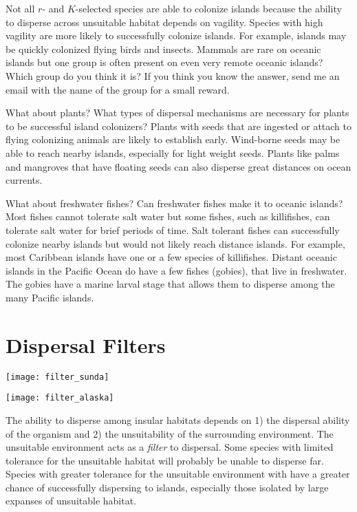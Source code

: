 \documentclass{tufte-handout}
\begin{document}
Not all $r$- and $K$-selected species are able to colonize islands because the ability to disperse across unsuitable habitat depends on vagility.  Species with high vagility are more likely to successfully colonize islands.  For example, islands may be quickly colonized flying birds and insects.  Mammals are rare on oceanic islands but one group is often present on even very remote oceanic islands?  Which group do you think it is? If you think you know the answer, send me an email with the name of the group for a small reward. 

What about plants?  What types of dispersal mechanisms are necessary for plants to be successful island colonizers?  Plants with seeds that are ingested or attach to flying colonizing animals are likely to establish early. Wind-borne seeds may be able to reach nearby islands, especially for light weight seeds.  Plants like palms and mangroves that have floating seeds can also disperse great distances on ocean currents.

What about freshwater fishes?  Can freshwater fishes make it to oceanic islands?  Most fishes cannot tolerate salt water but some fishes, such as killifishes, can tolerate salt water for brief periods of time. Salt tolerant fishes can successfully colonize nearby islands but would not likely reach distance islands.  For example, most Caribbean islands have one or a few species of killifishes. Distant oceanic islands in the Pacific Ocean do have a few fishes (gobies), that live in freshwater.  The gobies have a marine larval stage that allows them to disperse among the many Pacific islands.  

\section{Dispersal Filters}
\begin{marginfigure}%
	\texttt{[image: filter\_sunda]}
\end{marginfigure} 
\begin{marginfigure}%
	\texttt{[image: filter\_alaska]}
\end{marginfigure} 

The ability to disperse among insular habitats depends on 1) the dispersal ability of the organism and 2) the unsuitability of the surrounding environment.  The unsuitable environment acts as a \textit{filter} to dispersal.  Some species with limited tolerance for the unsuitable habitat will probably be unable to disperse far. Species with greater tolerance for the unsuitable environment with have a greater chance of successfully dispersing to islands, especially those isolated by large expanses of unsuitable habitat.  
\end{document}

